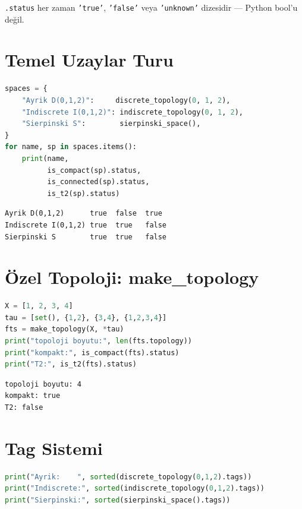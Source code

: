 \texttt{.status} her zaman \texttt{'true'}, \texttt{'false'} veya \texttt{'unknown'}
dizesidir --- Python bool'u değil.

\section{Temel Uzaylar Turu}

\begin{lstlisting}[language=Python]
spaces = {
    "Ayrik D(0,1,2)":     discrete_topology(0, 1, 2),
    "Indiscrete I(0,1,2)": indiscrete_topology(0, 1, 2),
    "Sierpinski S":        sierpinski_space(),
}
for name, sp in spaces.items():
    print(name,
          is_compact(sp).status,
          is_connected(sp).status,
          is_t2(sp).status)
\end{lstlisting}

\begin{verbatim}
Ayrik D(0,1,2)      true  false  true
Indiscrete I(0,1,2) true  true   false
Sierpinski S        true  true   false
\end{verbatim}

\section{Özel Topoloji: make\_topology}

\begin{lstlisting}[language=Python]
X = [1, 2, 3, 4]
tau = [set(), {1,2}, {3,4}, {1,2,3,4}]
fts = make_topology(X, *tau)
print("topoloji boyutu:", len(fts.topology))
print("kompakt:", is_compact(fts).status)
print("T2:", is_t2(fts).status)
\end{lstlisting}

\begin{verbatim}
topoloji boyutu: 4
kompakt: true
T2: false
\end{verbatim}

\section{Tag Sistemi}

\begin{lstlisting}[language=Python]
print("Ayrik:    ", sorted(discrete_topology(0,1,2).tags))
print("Indiscrete:", sorted(indiscrete_topology(0,1,2).tags))
print("Sierpinski:", sorted(sierpinski_space().tags))
\end{lstlisting}

